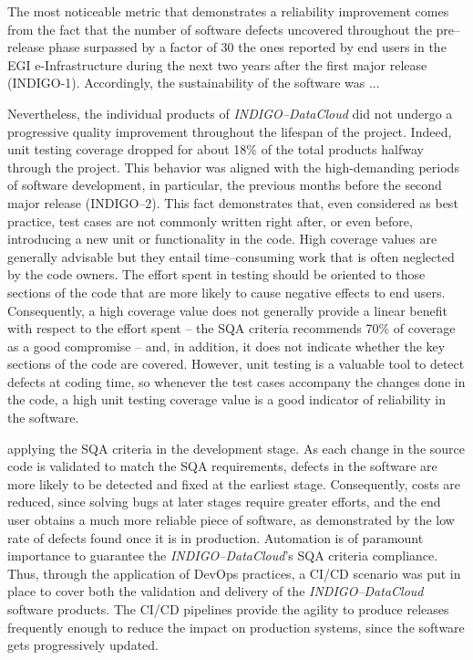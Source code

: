 The most noticeable metric that demonstrates a reliability improvement comes from the 
fact that the number of software defects uncovered throughout the pre--release phase 
surpassed by a factor of 30 the ones reported by end users in the EGI e-Infrastructure
during the next two years after the first major release (INDIGO-1). Accordingly, the
sustainability of the software was ...

Nevertheless, the individual products of {\sl INDIGO--DataCloud} did not undergo 
a progressive quality improvement throughout the lifespan of the project. Indeed,
unit testing coverage dropped for about 18\% of the total products halfway through
the project. This behavior was aligned with the high-demanding periods of software
development, in particular, the previous months before the second major release 
(INDIGO--2). This fact demonstrates that, even considered as best practice, test 
cases are not commonly written right after, or even before, introducing a new unit
or functionality in the code. High coverage values are generally advisable but they
entail time--consuming work that is often neglected by the code owners. The effort 
spent in testing should be oriented to those sections of the code that are more 
likely to cause negative effects to end users. Consequently, a high coverage value 
does not generally provide a linear benefit with respect to the effort spent -- the
SQA criteria recommends 70\% of coverage as a good compromise -- and, in addition,
it does not indicate whether the key sections of the code are covered. However, unit
testing is a valuable tool to detect defects at coding time, so whenever the test 
cases accompany the changes done in the code, a high unit testing coverage value is 
a good indicator of reliability in the software.


% 

applying the SQA criteria in the development stage. As each change in 
the source code is validated to match the SQA requirements, defects in the software 
are more likely to be detected and fixed at the earliest stage. Consequently, costs
are reduced, since solving bugs at later stages require greater efforts, and the end
user obtains a much more reliable piece of software, as demonstrated by the low rate
of defects found once it is in production. Automation is of paramount importance to 
guarantee the {\sl INDIGO--DataCloud}'s SQA criteria compliance. Thus, through the
application of DevOps practices, a CI/CD scenario was put in place to cover both the
validation and delivery of the {\sl INDIGO--DataCloud} software products. The CI/CD 
pipelines provide the agility to produce releases frequently enough to reduce the 
impact on production systems, since the software gets progressively updated. 


